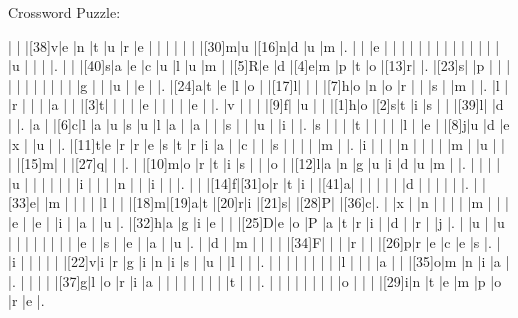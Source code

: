 \documentclass[12pt]{article}
\begin{document}
\libertine
\renewcommand\PuzzleClueFont{\rm\normalsize}
\begin{center}
  \huge{Crossword Puzzle:}
\end{center}
\vspace{1.5cm}
\begin{Puzzle}{22}{24}
  |{}  |{}  |[38]v|e   |n   |t   |u   |r   |e   |{}  |{}  |{}  |{}  |{}  |{}  |[30]m|u   |[16]n|d   |u   |m   |.
  |{}  |{}  |e   |{}  |{}  |{}  |{}  |{}  |{}  |{}  |{}  |{}  |{}  |{}  |{}  |{}  |{}  |u   |{}  |{}  |{}  |.
  |{}  |{}  |[40]s|a   |e   |c   |u   |l   |u   |m   |{}  |[5]R|e   |d   |[4]e|m   |p   |t   |o   |[13]r|{}  |.
  |[23]s|{}  |p   |{}  |{}  |{}  |{}  |{}  |{}  |{}  |{}  |{}  |{}  |{}  |g   |{}  |{}  |u   |{}  |e   |{}  |.
  |[24]a|t   |e   |l   |o   |{}  |[17]l|{}  |{}  |{}  |[7]h|o   |n   |o   |r   |{}  |{}  |s   |{}  |m   |{}  |.
  |l   |{}  |r   |{}  |{}  |{}  |a   |{}  |{}  |[3]t|{}  |{}  |{}  |{}  |e   |{}  |{}  |{}  |{}  |e   |{}  |.
  |v   |{}  |{}  |{}  |[9]f|{}  |u   |{}  |{}  |[1]h|o   |[2]s|t   |i   |s   |{}  |{}  |[39]l|{}  |d   |{}  |.
  |a   |{}  |[6]c|l   |a   |u   |s   |u   |l   |a   |{}  |a   |{}  |{}  |s   |{}  |{}  |u   |{}  |i   |{}  |.
  |s   |{}  |{}  |{}  |t   |{}  |{}  |{}  |{}  |l   |{}  |e   |{}  |[8]j|u   |d   |e   |x   |{}  |u   |{}  |.
  |[11]t|e   |r   |r   |e   |s   |t   |r   |i   |a   |{}  |c   |{}  |{}  |s   |{}  |{}  |{}  |{}  |m   |{}  |.
  |i   |{}  |{}  |{}  |n   |{}  |{}  |{}  |{}  |m   |{}  |u   |{}  |{}  |{}  |[15]m|{}  |{}  |[27]q|{}  |{}  |.
  |{}  |[10]m|o   |r   |t   |i   |s   |{}  |{}  |o   |{}  |[12]l|a   |n   |g   |u   |i   |d   |u   |m   |{}  |.
  |{}  |{}  |{}  |{}  |u   |{}  |{}  |{}  |{}  |{}  |{}  |i   |{}  |{}  |{}  |n   |{}  |{}  |i   |{}  |{}  |.
  |{}  |{}  |[14]f|[31]o|r   |t   |i   |{}  |[41]a|{}  |{}  |{}  |{}  |{}  |{}  |d   |{}  |{}  |{}  |{}  |{}  |.
  |{}  |[33]e|{}  |m   |{}  |{}  |{}  |{}  |l   |{}  |{}  |[18]m|[19]a|t   |[20]r|i   |[21]s|{}  |[28]P|{}  |[36]c|.
  |{}  |x   |{}  |n   |{}  |{}  |{}  |{}  |m   |{}  |{}  |{}  |e   |{}  |e   |{}  |i   |{}  |a   |{}  |u   |.
  |[32]h|a   |g   |i   |e   |{}  |{}  |[25]D|e   |o   |P   |a   |t   |r   |i   |{}  |d   |{}  |r   |{}  |j   |.
  |{}  |u   |{}  |u   |{}  |{}  |{}  |{}  |{}  |{}  |{}  |{}  |e   |{}  |s   |{}  |e   |{}  |a   |{}  |u   |.
  |{}  |d   |{}  |m   |{}  |{}  |{}  |{}  |[34]F|{}  |{}  |{}  |r   |{}  |{}  |[26]p|r   |e   |c   |e   |s   |.
  |{}  |i   |{}  |{}  |{}  |{}  |{}  |[22]v|i   |r   |g   |i   |n   |i   |s   |{}  |u   |{}  |l   |{}  |{}  |.
  |{}  |{}  |{}  |{}  |{}  |{}  |{}  |{}  |l   |{}  |{}  |{}  |a   |{}  |{}  |[35]o|m   |n   |i   |a   |{}  |.
  |{}  |{}  |{}  |{}  |[37]g|l   |o   |r   |i   |a   |{}  |{}  |{}  |{}  |{}  |{}  |{}  |{}  |t   |{}  |{}  |.
  |{}  |{}  |{}  |{}  |{}  |{}  |{}  |{}  |o   |{}  |{}  |{}  |[29]i|n   |t   |e   |m   |p   |o   |r   |e   |.
\end{Puzzle}
\end{document}
